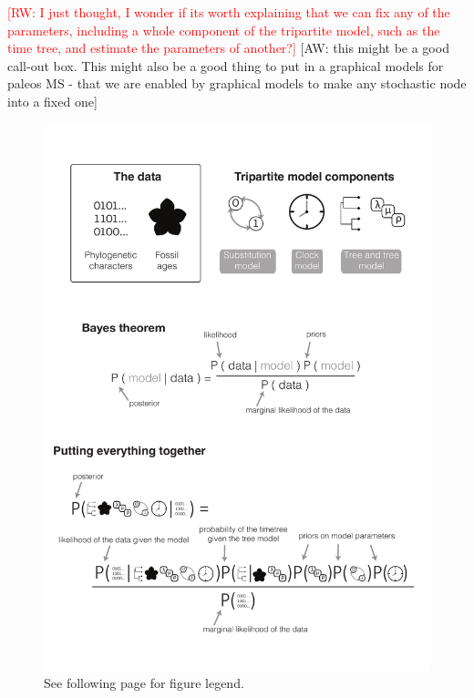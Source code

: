 \documentclass[11pt]{article}
\newcommand{\rw}[1]{{\textcolor{red}{[RW: #1]}}} %
\newcommand{\aw}[1]{{\textcolor{armygreen}{[AW: #1]}}} %
\begin{document}
\rw{I just thought, I wonder if its worth explaining that we can fix any of the parameters, including a whole component of the tripartite model, such as the time tree, and estimate the parameters of another?} 
\aw{this might be a good call-out box. This might also be a good thing to put in a graphical models for paleos MS - that we are enabled by graphical models to make any stochastic node into a fixed one}

\clearpage



\begin{figure}
\centering
\includegraphics[width=\textwidth]{figures/bayes-theorem-v2.pdf}
\caption{\footnotesize See following page for figure legend.}
\label{fig:bayes}
\end{figure}
\end{document}

